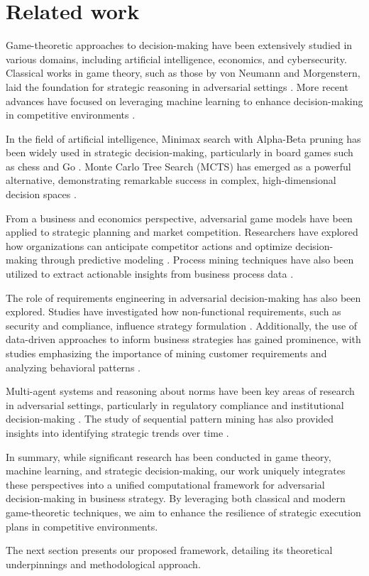 \section{Related work}
Game-theoretic approaches to decision-making have been extensively studied in various domains, including artificial intelligence, economics, and cybersecurity. Classical works in game theory, such as those by von Neumann and Morgenstern, laid the foundation for strategic reasoning in adversarial settings \cite{berliner1980backgammon}. More recent advances have focused on leveraging machine learning to enhance decision-making in competitive environments \cite{hassabis2016alphago,mikolov2013efficient}.

In the field of artificial intelligence, Minimax search with Alpha-Beta pruning has been widely used in strategic decision-making, particularly in board games such as chess and Go \cite{berliner1980backgammon,hassabis2016alphago}. Monte Carlo Tree Search (MCTS) has emerged as a powerful alternative, demonstrating remarkable success in complex, high-dimensional decision spaces \cite{hassabis2016alphago}.

From a business and economics perspective, adversarial game models have been applied to strategic planning and market competition. Researchers have explored how organizations can anticipate competitor actions and optimize decision-making through predictive modeling \cite{boella2008reasoning,allen1983maintaining}. Process mining techniques have also been utilized to extract actionable insights from business process data \cite{ProM,HSRS}.

The role of requirements engineering in adversarial decision-making has also been explored. Studies have investigated how non-functional requirements, such as security and compliance, influence strategy formulation \cite{cleland2006detection,JDDS,GSSD}. Additionally, the use of data-driven approaches to inform business strategies has gained prominence, with studies emphasizing the importance of mining customer requirements and analyzing behavioral patterns \cite{QZJZ,SCJM,GP,KDFR}.

Multi-agent systems and reasoning about norms have been key areas of research in adversarial settings, particularly in regulatory compliance and institutional decision-making \cite{blevi2015discovery,teinemaa2015diagnostics}. The study of sequential pattern mining has also provided insights into identifying strategic trends over time \cite{FZLC,SG}.

In summary, while significant research has been conducted in game theory, machine learning, and strategic decision-making, our work uniquely integrates these perspectives into a unified computational framework for adversarial decision-making in business strategy. By leveraging both classical and modern game-theoretic techniques, we aim to enhance the resilience of strategic execution plans in competitive environments.

The next section presents our proposed framework, detailing its theoretical underpinnings and methodological approach.